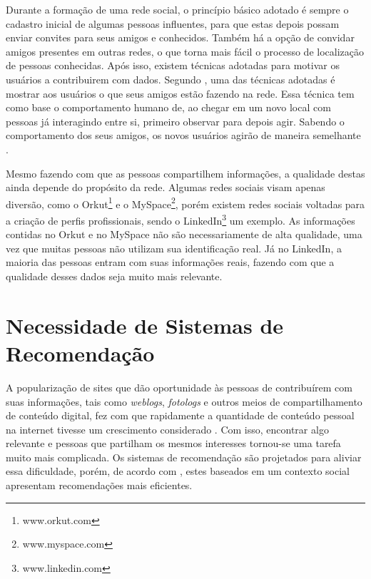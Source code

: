 
Durante a formação de uma rede social, o princípio básico adotado é sempre o cadastro inicial de algumas pessoas influentes, para que estas depois possam enviar convites para seus amigos e conhecidos. Também há a opção de convidar amigos presentes em outras redes, o que torna mais fácil o processo de localização de pessoas conhecidas. Após isso, existem técnicas adotadas para motivar os usuários a contribuirem com dados. Segundo \cite{burke2009fmm}, uma das técnicas adotadas é mostrar aos usuários o que seus amigos estão fazendo na rede. Essa técnica tem como base o comportamento humano de, ao chegar em um novo local com pessoas já interagindo entre si, primeiro observar para depois agir. Sabendo o comportamento dos seus amigos, os novos usuários agirão de maneira semelhante \cite{burke2009fmm}.

Mesmo fazendo com que as pessoas compartilhem informações, a qualidade destas ainda depende do propósito da rede. Algumas redes sociais visam apenas diversão, como o Orkut\footnote{www.orkut.com} e o MySpace\footnote{www.myspace.com}, porém existem redes sociais voltadas para a criação de perfis profissionais, sendo o LinkedIn\footnote{www.linkedin.com} um exemplo. As informações contidas no Orkut e no MySpace não são necessariamente de alta qualidade, uma vez que muitas pessoas não utilizam sua identificação real. Já no LinkedIn, a maioria das pessoas entram com suas informações reais, fazendo com que a qualidade desses dados seja muito mais relevante.

\section{Necessidade de Sistemas de Recomendação}

A popularização de sites que dão oportunidade às pessoas de contribuírem com suas informações, tais como \textit{weblogs}, \textit{fotologs} e outros meios de compartilhamento de conteúdo digital, fez com que rapidamente a quantidade de conteúdo pessoal na internet tivesse um crescimento considerado \cite{bonhard2007devil}. Com isso, encontrar algo relevante e pessoas que partilham os mesmos interesses tornou-se uma tarefa muito mais complicada. Os sistemas de recomendação são projetados para aliviar essa dificuldade, porém, de acordo com \cite{bonhard2007devil}, estes baseados em um contexto social apresentam recomendações mais eficientes.

